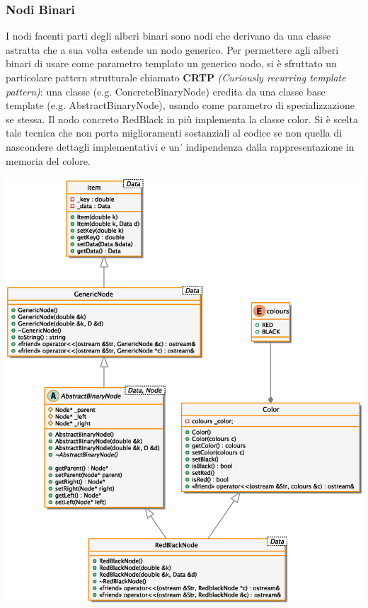 \subsubsection{Nodi Binari}
\indent I nodi facenti parti degli alberi
binari sono nodi che derivano da una classe astratta che a sua
volta estende un nodo generico.\newline
\indent Per permettere agli alberi binari di usare come parametro
templato un generico nodo, si \`e sfruttato un particolare
pattern strutturale chiamato \textbf{CRTP} \textit{(Curiously recurring 
template pattern)}: una classe (e.g. ConcreteBinaryNode) eredita
da una classe base template (e.g. AbstractBinaryNode), usando
come parametro di specializzazione se stessa. Il nodo concreto
RedBlack in pi\`u implementa la classe color. Si \`e scelta tale tecnica che non porta
miglioramenti sostanziali al codice se non quella di nascondere
dettagli implementativi e un' indipendenza dalla rappresentazione in memoria del colore.
\begin{center}
\includegraphics[scale=0.6]{tesina_tex/rbhash/2img/nodes.eps}
\end{center}
